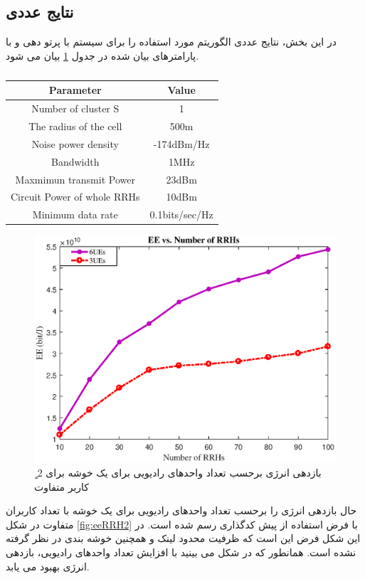   \subsection{نتایج عددی}
  در این بخش، نتایج عددی الگوریتم مورد استفاده را برای سیستم  با پرتو دهی  و با پارامترهای بیان شده در جدول \ref{tab:title3} \cite{ofdma} بیان می شود.
\begin{latin} 
 \begin{table}[H]
 \caption {} \label{tab:title3} 
 \begin{center}
  \begin{tabular}{||c c ||} 
  \hline
  Parameter & Value \\ [0.5ex] 
  \hline\hline
  Number of cluster S & 1 \\ 
  \hline
    The radius of the cell & 500m \\ 
  \hline
  Noise power density & -174dBm/Hz\\
  \hline
  Bandwidth & 1MHz \\
  \hline
 Maxmimun transmit Power & 23dBm \\
  \hline
Circuit Power of whole RRHs & 10dBm \\
  \hline
  Minimum data rate &  0.1bits/sec/Hz \\ [1ex] 
  \hline
 \end{tabular}
 \end{center}
 \end{table}
 \end{latin}

\begin{figure}[H]
  \centering
    \includegraphics[width=\linewidth]{./fig/rrhul}
  \caption{ٍ بازدهی انرژی برحسب تعداد واحدهای رادیویی برای یک خوشه برای 2 کاربر متفاوت}
  \label{fig:rrhul}
  \end{figure}
 حال بازدهی انرژی را برحسب تعداد واحدهای رادیویی برای یک خوشه با تعداد کاربران متفاوت  در شکل \eqref{fig:eeRRH2} با فرض استفاده از پیش کدگذاری  رسم شده است. در این شکل فرض این است که ظرفیت محدود لینک  و همچنین خوشه بندی در نظر گرفته نشده است. همانطور که در شکل می بینید با افزایش تعداد واحدهای رادیویی، بازدهی انرژی بهبود می یابد.

